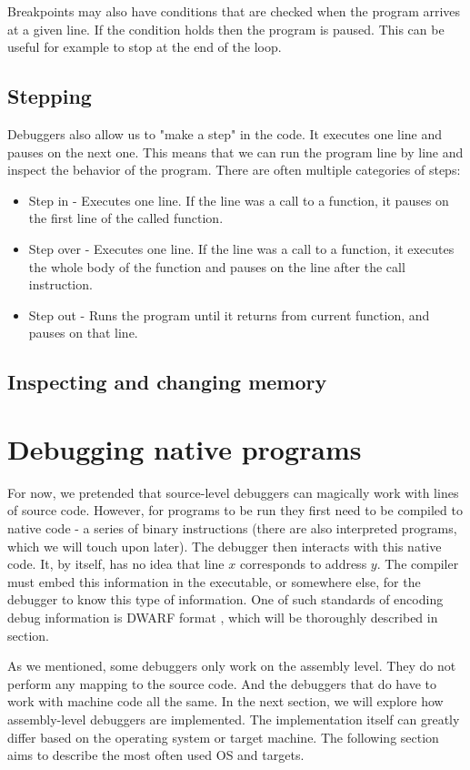 Breakpoints may also have conditions that are checked when the program arrives at a given line. If the condition holds then the program is paused. This can be useful for example to stop at the end of the loop.

\subsection{Stepping}
Debuggers also allow us to "make a step" in the code. It executes one line and pauses on the next one. This means that we can run the program line by line and inspect the behavior of the program.
There are often multiple categories of steps:

\begin{itemize}
    \item Step in - Executes one line. If the line was a call to a function, it pauses on the first line of the called function.
    \item Step over - Executes one line. If the line was a call to a function, it executes the whole body of the function and pauses on the line after the call instruction.
    \item Step out - Runs the program until it returns from current function, and pauses on that line.
\end{itemize}

\subsection{Inspecting and changing memory}

\section{Debugging native programs}
For now, we pretended that source-level debuggers can magically work with lines of source code. However, for programs to be run they first need to be compiled to native code - a series of binary instructions (there are also interpreted programs, which we will touch upon later). The debugger then interacts with this native code. It, by itself, has no idea that line $x$ corresponds to address $y$. The compiler must embed this information in the executable, or somewhere else, for the debugger to know this type of information. One of such standards of encoding debug information is DWARF format \cite{dwarf}, which will be thoroughly described in  section. 

As we mentioned, some debuggers only work on the assembly level. They do not perform any mapping to the source code. And the debuggers that do have to work with machine code all the same. In the next section, we will explore how assembly-level debuggers are implemented. The implementation itself can greatly differ based on the operating system or target machine. The following section aims to describe the most often used OS and targets.

